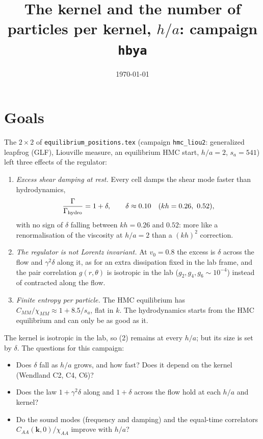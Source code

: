 \documentclass[11pt,aps,preprint,nofootinbib,superscriptaddress,tightenlines]{revtex4-2}
\def\st{\begin{equation}}
\def\stp{\end{equation}}
\begin{document}
\title{The kernel and the number of particles per kernel, $h/a$: campaign \texttt{hbya}}
\date{\today}
\maketitle

\section{Goals}

The $2\times2$ of \texttt{equilibrium\_positions.tex} (campaign \texttt{hmc\_liou2}: generalized leapfrog (GLF), Liouville measure, an equilibrium
HMC start, $h/a=2$, $s_a=541$) left three effects of the regulator:
\begin{enumerate}
\item \emph{Excess shear damping at rest.}  Every cell damps the shear mode faster than hydrodynamics,
  \st
  \frac{\Gamma}{\Gamma_{\rm hydro}}=1+\delta,\qquad \delta\approx0.10\quad (kh=0.26,\ 0.52),
  \stp
  with no sign of $\delta$ falling between $kh=0.26$ and $0.52$: more like a renormalisation of the viscosity at $h/a=2$ than a $(kh)^2$
  correction.
\item \emph{The regulator is not Lorentz invariant.}  At $v_0=0.8$ the excess is $\delta$ across the flow and $\gamma^2\delta$ along it, as for an
  extra dissipation fixed in the lab frame, and the pair correlation $g(r,\theta)$ is isotropic in the lab ($g_2,g_4,g_6\sim10^{-4}$) instead of
  contracted along the flow.
\item \emph{Finite entropy per particle.}  The HMC equilibrium has $C_{MM}/\chi_{MM}\approx1+8.5/s_a$, flat in $k$.  The hydrodynamics starts from
  the HMC equilibrium and can only be as good as it.
\end{enumerate}
The kernel is isotropic in the lab, so (2) remains at every $h/a$; but its size is set by $\delta$.  The questions for this campaign:
\begin{itemize}
\item Does $\delta$ fall as $h/a$ grows, and how fast?  Does it depend on the kernel (Wendland C2, C4, C6)?
\item Does the law $1+\gamma^2\delta$ along and $1+\delta$ across the flow hold at each $h/a$ and kernel?
\item Do the sound modes (frequency and damping) and the equal-time correlators $C_{AA}(\bm k,0)/\chi_{AA}$ improve with $h/a$?
\end{itemize}
\end{document}
